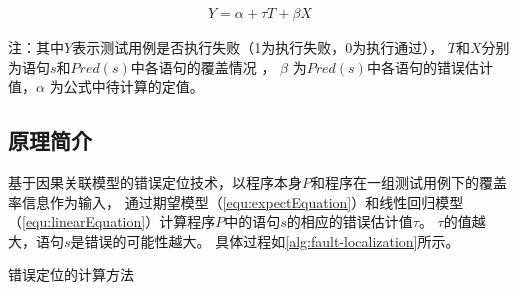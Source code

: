 \begin{equation}
\begin{aligned}
Y =\alpha +\tau T+\beta X 
\end{aligned}
\label{equ:linearEquation} 
\end{equation}
\begin{scriptsize}
	注：其中$Y$表示测试用例是否执行失败（1为执行失败，0为执行通过），
	$T$和$X$分别为语句$s$和$Pred(s)$中各语句的覆盖情况 ，
	$\beta$ 为$Pred(s)$中各语句的错误估计值，$\alpha$ 为公式中待计算的定值。  \par
	
\end{scriptsize}

\subsection{原理简介}



基于因果关联模型的错误定位技术，以程序本身$P$和程序在一组测试用例下的覆盖率信息作为输入，
通过期望模型（\autoref{equ:expectEquation}）和线性回归模型（\autoref{equ:linearEquation}）计算程序$P$中的语句$s$的相应的错误估计值$\tau$。
$\tau$的值越大，语句$s$是错误的可能性越大。
具体过程如\autoref{alg:fault-localization}所示。


\begin{algorithm}[!ht]
	
\tablewuhao

\caption{错误定位的计算方法} 


\label{alg:fault-localization}




\end{algorithm}






